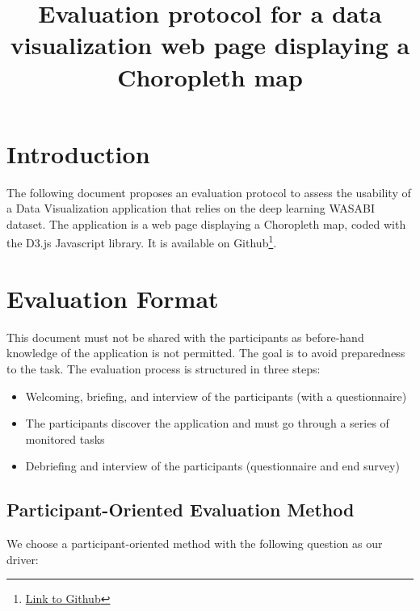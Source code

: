 \documentclass[twocolumn, letterpaper,13pt]{scrartcl}
\begin{document}
    \title{\color{seablue}Evaluation protocol for a data visualization web page displaying a Choropleth map}

	\maketitle
	
    \section*{Introduction}
    
    The following document proposes an evaluation protocol to assess the usability of a Data Visualization application that relies on the deep learning WASABI dataset.
    \newline\newline
    The application is a web page displaying a Choropleth map, coded with the D3.js Javascript library. It is available on Github\footnote{\href{https://github.com/LMquentinLR/choropleth\_wasabi\_dataset}{Link to Github}}.
    
    \section*{Evaluation Format}

    This document must not be shared with the participants as before-hand knowledge of the application is not permitted. The goal is to avoid preparedness to the task.
    \newline
    \newline
    The evaluation process is structured in three steps:
    \begin{itemize}
        \item Welcoming, briefing, and interview of the participants (with a questionnaire)
        \item The participants discover the application and must go through a series of monitored tasks
        \item Debriefing and interview of the participants (questionnaire and end survey)
    \end{itemize}

    \subsection*{Participant-Oriented Evaluation Method}
    
    We choose a participant-oriented method with the following question as our driver: 
    
\end{document}

